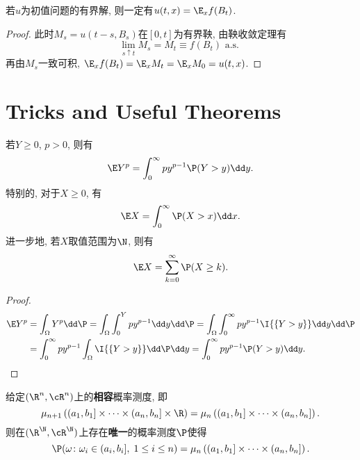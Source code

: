 \documentclass[a4paper, 10pt]{ctexart}
\begin{document}
\begin{theorem}
	若$u$为初值问题的有界解, 则一定有$u(t, x) = \E_x f(B_t)$. 
\end{theorem}
\begin{proof}
	此时$M_s = u(t-s, B_s)$在$[0, t]$为有界鞅, 由鞅收敛定理有
	\begin{equation*}
		\lim_{s \uparrow t} M_s = M_t \equiv f(B_t) \text{ a.s. }
	\end{equation*}
	再由$M_s$一致可积, $\E_x f(B_t) = \E_x M_t = \E_x M_0 = u(t, x)$. 
\end{proof}

\appendix
\newpage
\section{Tricks and Useful Theorems}

\begin{lemma}\label{lemma:trickOfExpectation}
	若$Y \geq 0$, $p > 0$, 则有
	\begin{equation}
		\E Y^p = \int_0^{\infty} p y^{p-1} \P(Y > y) \dd y. 
	\end{equation}
	特别的, 对于$X \geq 0$, 有
	\begin{equation*}
		\E X = \int_0^{\infty} \P(X > x) \dd x. 
	\end{equation*}
	进一步地, 若$X$取值范围为$\N$, 则有
	\begin{equation*}
		\E X = \sum_{k=0}^{\infty} \P(X \geq k). 
	\end{equation*}
\end{lemma}
\begin{proof}
	\begin{align*}
		\E Y^p 
		&= \int_\Omega Y^p \dd \P 
		= \int_\Omega \int_0^Y p y^{p-1} \dd y \dd \P 
		= \int_\Omega \int_0^{\infty} p y^{p-1} \I{\{Y > y\}} \dd y \dd \P \\
		&= \int_0^{\infty} p y^{p-1} \int_\Omega \I{\{Y > y\}} \dd \P \dd y
		= \int_0^{\infty} p y^{p-1} \P(Y > y) \dd y.
	\end{align*}
\end{proof}

\begin{theorem}[Kolmogorov扩张定理]\label{thm:KolmogorovExt}
	给定$(\R^n, \cR^n)$上的\textbf{相容}概率测度, 即
	\begin{equation*}
		\mu_{n+1}\left( (a_1,b_1] \times \cdots \times (a_n, b_n] \times \R \right)
		= \mu_{n}\left( (a_1,b_1] \times \cdots \times (a_n, b_n] \right). 
	\end{equation*}
	则在$(\R^{\N}, \cR^{\N})$上存在\textbf{唯一}的概率测度$\P$使得
	\begin{equation*}
		\P(\omega \colon \omega_i \in (a_i,b_i],\; 1 \leq i \leq n)
		= \mu_{n}\left( (a_1,b_1] \times \cdots \times (a_n, b_n] \right). 
	\end{equation*}
\end{theorem}
\end{document}
